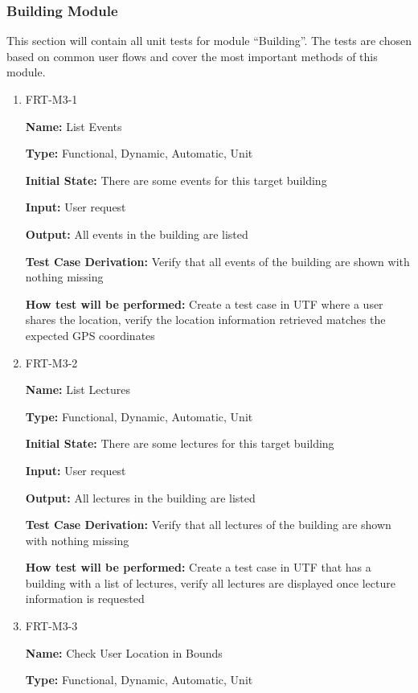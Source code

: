 \documentclass[12pt, titlepage]{article}
\begin{document}
\subsubsection{Building Module}

This section will contain all unit tests for module ``Building''. The tests are chosen based on common user flows and cover the most important methods of this module.

\begin{enumerate}
\item{FRT-M3-1}

\textbf{Name:} List Events

\textbf{Type:} Functional, Dynamic, Automatic, Unit
					
\textbf{Initial State:} There are some events for this target building
					
\textbf{Input:} User request
					
\textbf{Output:} All events in the building are listed

\textbf{Test Case Derivation:} Verify that all events of the building are shown with nothing missing

\textbf{How test will be performed:} Create a test case in UTF where a user shares the location, verify the location information retrieved matches the expected GPS coordinates

\item{FRT-M3-2}

\textbf{Name:} List Lectures

\textbf{Type:} Functional, Dynamic, Automatic, Unit
					
\textbf{Initial State:} There are some lectures for this target building
					
\textbf{Input:} User request
					
\textbf{Output:} All lectures in the building are listed

\textbf{Test Case Derivation:} Verify that all lectures of the building are shown with nothing missing

\textbf{How test will be performed:} Create a test case in UTF that has a building with a list of lectures, verify all lectures are displayed once lecture information is requested

\item{FRT-M3-3}

\textbf{Name:} Check User Location in Bounds

\textbf{Type:} Functional, Dynamic, Automatic, Unit


\end{enumerate}
\end{document}
